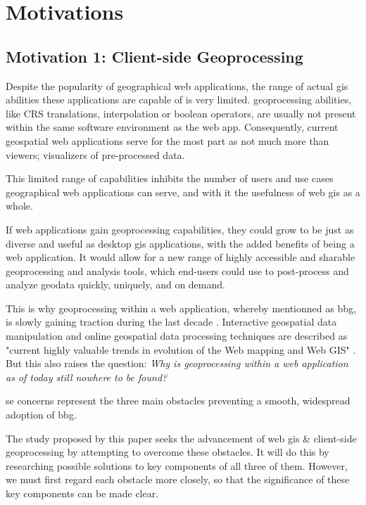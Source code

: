 \section{Motivations}

\subsection{Motivation 1: Client-side Geoprocessing}

Despite the popularity of geographical web applications, the range of actual \ac{gis} abilities these applications are capable of is very limited. \ac{geoprocessing} abilities, like CRS translations, interpolation or boolean operators, are usually not present within the same software environment as the web app. Consequently, current geospatial web applications serve for the most part as not much more than viewers; visualizers of pre-processed data. 

This limited range of capabilities inhibits the number of users and use cases geographical web applications can serve, and with it the usefulness of web \ac{gis} as a whole. 

If web applications gain \ac{geoprocessing} capabilities, they could grow to be just as diverse and useful as desktop \ac{gis} applications, with the added benefits of being a web application. It would allow for a new range of highly accessible and sharable geoprocessing and analysis tools, which end-users could use to post-process and analyze geodata quickly, uniquely, and on demand.

This is why \ac{geoprocessing} within a web application, whereby mentionned as \ac{bbg}, is slowly gaining traction during the last decade \cite{kulawiak_analysis_2019, panidi_hybrid_2015, hamilton_client-side_2014}. Interactive geospatial data manipulation and online geospatial data processing techniques are described as "current highly valuable trends in evolution of the Web mapping and Web GIS" \cite{panidi_hybrid_2015}. But this also raises the question: \textit{Why is geoprocessing within a web application as of today still nowhere to be found?} 

se concerns represent the three main obstacles preventing a smooth, widespread adoption of \ac{bbg}. 

The study proposed by this paper seeks the advancement of web \ac{gis} \& client-side geoprocessing by attempting to overcome these obstacles. It will do this by researching possible solutions to key components of all three of them. However, we must first regard each obstacle more closely, so that the significance of these key components can be made clear. 

